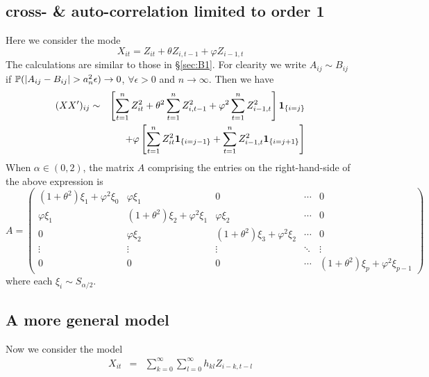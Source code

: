 \documentclass{article}
\begin{document}
\subsection{cross- \& auto-correlation limited to order 1}
Here we consider the mode
\[
X_{it} = Z_{it} + \theta Z_{i, t-1} + \varphi Z_{i-1, t}
\]
The calculations are similar to those in \S\ref{sec:B1}. For clearity
we write $A_{ij} \sim B_{ij}$ if $\mathbb{P}(|A_{ij} - B_{ij}| > a_n^2 \epsilon)
\to 0$, $\forall \epsilon > 0$ and $n \to \infty$. Then we have
\begin{eqnarray*}
  (XX')_{ij} &\sim& \left[
    \sum_{t=1}^n Z_{it}^2 + \theta^2 \sum_{t=1}^n Z_{i,t-1}^2 +
    \varphi^2 \sum_{t=1}^n Z_{i-1,t}^2 
  \right]\mathbf{1}_{\{i=j\}} \\
  && + \varphi \left[
    \sum_{t=1}^n Z_{it}^2 \mathbf{1}_{\{i=j-1\}} + \sum_{t=1}^n Z_{i-1, t}^2 \mathbf{1}_{\{i=j+1\}}
  \right]
\end{eqnarray*}
When $\alpha \in (0,2)$, the matrix $A$ comprising the entries on the
right-hand-side of the above expression is
\[
A =
\begin{pmatrix}
  (1 + \theta^2)\xi_1 + \varphi^2 \xi_0 & \varphi \xi_1 & 0 & \cdots & 0 \\
  \varphi \xi_1 & (1 + \theta^2)\xi_2 + \varphi^2 \xi_1 & \varphi \xi_2 & \cdots & 0 \\
  0 & \varphi \xi_2 & (1 + \theta^2)\xi_3 + \varphi^2 \xi_2 & \cdots & 0 \\
  \vdots & \vdots & \vdots & \ddots & \vdots \\
  0 & 0 & 0 & \cdots & (1 + \theta^2)\xi_p + \varphi^2 \xi_{p-1}
\end{pmatrix}
\]
where each $\xi_i \sim S_{\alpha/2}$.

\subsection{A more general model}\label{sec:GeneralModel}
Now we consider the model
\begin{eqnarray*}
  X_{it} &=& \sum_{k=0}^\infty \sum_{l=0}^\infty h_{kl} Z_{i-k,t-l}
\end{eqnarray*}
\end{document}
